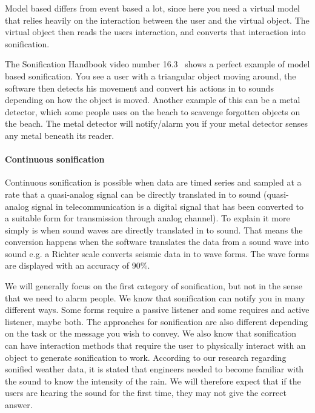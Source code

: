 Model based differs from event based a lot, since here you need a virtual model that relies heavily on the interaction between the user and the virtual object. 
The virtual object then reads the users interaction, and converts that interaction into sonification. 

The Sonification Handbook video number 16.3~\cite*[Ch. 16, Vid. 16.3]{Hermann2011} shows a perfect example of model based sonification. 
You see a user with a triangular object moving around, the software then detects his movement and convert his actions in to sounds depending on how the object is moved. 
Another example of this can be a metal detector, which some people uses on the beach to scavenge forgotten objects on the beach. 
The metal detector will notify/alarm you if your metal detector senses any metal beneath its reader. 



\paragraph{Continuous sonification} %
\label{par:continuous_sonification}

Continuous sonification is possible when data are timed series and sampled at a rate that a quasi-analog signal can be directly translated in to sound (quasi-analog signal in telecommunication is a digital signal that has been converted to a suitable form for transmission through analog channel). 
To explain it more simply is when sound waves are directly translated in to sound. 
That means the conversion happens when the software translates the data from a sound wave into sound e.g. a Richter scale converts seismic data in to wave forms. 
The wave forms are displayed with an accuracy of 90\%.



We will generally focus on the first category of sonification, but not in the sense that we need to alarm people.
We know that sonification can notify you in many different ways. 
Some forms require a passive listener and some requires and active listener, maybe both. 
The approaches for sonification are also different depending on the task or the message you wish to convey. 
We also know that sonification can have interaction methods that require the user to physically interact with an object to generate sonification to work. 
According to our research regarding sonified weather data, it is stated that engineers needed to become familiar with the sound to know the intensity of the rain. 
We will therefore expect that if the users are hearing the sound for the first time, they may not give the correct answer.


